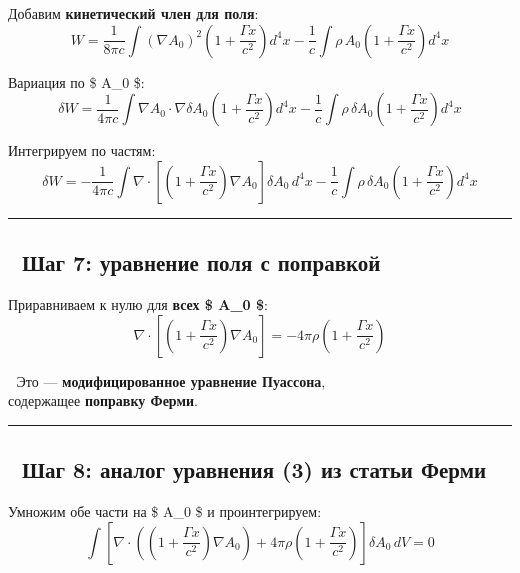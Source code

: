 \documentclass[11pt]{article}
\begin{document}
Добавим \textbf{кинетический член для поля}: \[
W = \frac{1}{8\pi c} \int (\nabla A_0)^2 \left( 1 + \frac{\Gamma x}{c^2} \right) d^4x - \frac{1}{c} \int \rho \, A_0 \left( 1 + \frac{\Gamma x}{c^2} \right) d^4x
\]

Вариация по \$ A\_0 \$: \[
\delta W = \frac{1}{4\pi c} \int \nabla A_0 \cdot \nabla \delta A_0 \left( 1 + \frac{\Gamma x}{c^2} \right) d^4x - \frac{1}{c} \int \rho \, \delta A_0 \left( 1 + \frac{\Gamma x}{c^2} \right) d^4x
\]

Интегрируем по частям: \[
\delta W = -\frac{1}{4\pi c} \int \nabla \cdot \left[ \left( 1 + \frac{\Gamma x}{c^2} \right) \nabla A_0 \right] \delta A_0 \, d^4x - \frac{1}{c} \int \rho \, \delta A_0 \left( 1 + \frac{\Gamma x}{c^2} \right) d^4x
\]

\begin{center}\rule{0.5\linewidth}{\linethickness}\end{center}

\subsection{🔹 Шаг 7: уравнение поля с
поправкой}\label{ux448ux430ux433-7-ux443ux440ux430ux432ux43dux435ux43dux438ux435-ux43fux43eux43bux44f-ux441-ux43fux43eux43fux440ux430ux432ux43aux43eux439}

Приравниваем к нулю для \textbf{всех \$ \delta A\_0 \$}: \[
\boxed{
\nabla \cdot \left[ \left( 1 + \frac{\Gamma x}{c^2} \right) \nabla A_0 \right] = -4\pi \rho \left( 1 + \frac{\Gamma x}{c^2} \right)
}
\]

📌 Это --- \textbf{модифицированное уравнение Пуассона},\\
содержащее \textbf{поправку Ферми}.

\begin{center}\rule{0.5\linewidth}{\linethickness}\end{center}

\subsection{🔹 Шаг 8: аналог уравнения (3) из статьи
Ферми}\label{ux448ux430ux433-8-ux430ux43dux430ux43bux43eux433-ux443ux440ux430ux432ux43dux435ux43dux438ux44f-3-ux438ux437-ux441ux442ux430ux442ux44cux438-ux444ux435ux440ux43cux438}

Умножим обе части на \$ \delta A\_0 \$ и проинтегрируем: \[
\int \left[ \nabla \cdot \left( \left( 1 + \frac{\Gamma x}{c^2} \right) \nabla A_0 \right) + 4\pi \rho \left( 1 + \frac{\Gamma x}{c^2} \right) \right] \delta A_0 \, dV = 0
\]
\end{document}
